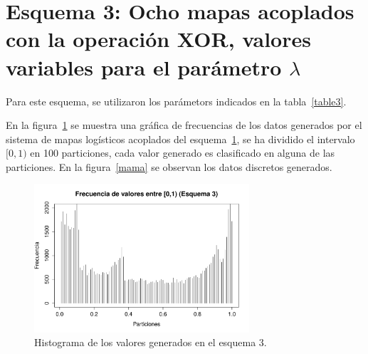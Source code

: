 \documentclass[preprint]{elsarticle}
\begin{document}
\section{Esquema 3: \textbf{Ocho mapas acoplados con la operación XOR, valores variables para el parámetro $\lambda$}}
\label{esq3}

Para este esquema, se utilizaron los parámetors indicados en la tabla~\ref{table3}.
\begin{table}[H]
\centering
{}
\caption{Valores para cada uno de los mapas utilizados en el esquema 3.}
\label{table3}
\end{table}

En la figura~\ref{pari} se muestra una gráfica de frecuencias de los datos generados por el sistema de mapas logísticos acoplados del esquema~\ref{esq3}, se ha dividido el intervalo $[0,1)$ en 100 particiones, cada valor generado es clasificado en alguna de las particiones. En la figura~\ref{mama} se observan los datos discretos generados.

\begin{figure}[H]  
\centering
\includegraphics[width=8cm]{fesq3l.pdf}
\caption{Histograma de los valores generados en el esquema 3.}
\label{pari}
\end{figure}
\end{document}
